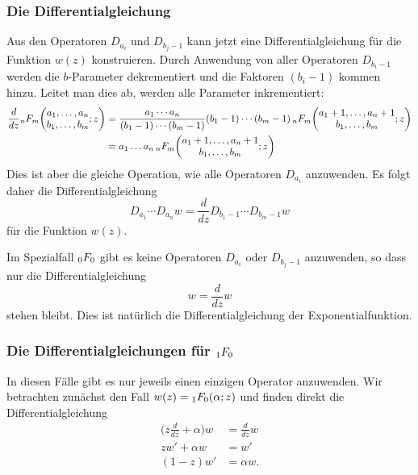 \subsubsection{Die Differentialgleichung}
Aus den Operatoren $D_{a_i}$ und $D_{b_j-1}$ kann jetzt eine
Differentialgleichung für die Funktion $w(z)$ konstruieren.
Durch Anwendung von aller Operatoren $D_{b_i-1}$ werden die
$b$-Parameter dekrementiert und die Faktoren $(b_i-1)$ kommen hinzu.
Leitet man dies ab, werden alle Parameter inkrementiert:
\begin{align*}
\frac{d}{dz}
\mathstrut_nF_m\biggl(
\begin{matrix}a_1,\dots,a_n\\
b_1,\dots,b_m\end{matrix};z
\biggr)
&=
\frac{a_1\cdots a_n}{(b_1-1)\cdots(b_m-1)}
(b_1-1)\cdots(b_m-1)
\,\mathstrut_nF_m\biggl(
\begin{matrix}a_1+1,\dots,a_n+1\\
b_1,\dots,b_m\end{matrix};z
\biggr)
\\
&=
a_1\dots a_n
\,\mathstrut_nF_m\biggl(
\begin{matrix}a_1+1,\dots,a_n+1\\
b_1,\dots,b_m\end{matrix};z
\biggr)
\end{align*}
Dies ist aber die gleiche Operation, wie alle Operatoren $D_{a_i}$ 
anzuwenden.
Es folgt daher die Differentialgleichung 
\[
D_{a_1}\cdots D_{a_n} w = \frac{d}{dz} D_{b_1-1}\cdots D_{b_m-1} w
\]
für die Funktion $w(z)$.

\begin{beispiel}
Im Spezialfall $\mathstrut_0F_0$ gibt es keine Operatoren $D_{a_i}$
oder $D_{b_j-1}$ anzuwenden, so dass nur die Differentialgleichung
\[
w=\frac{d}{dz}w
\]
stehen bleibt.
Dies ist natürlich die Differentialgleichung der Exponentialfunktion.
\end{beispiel}

%
%
\subsubsection{Die Differentialgleichungen für $\mathstrut_1F_0$}
In diesen Fälle gibt es nur jeweils einen einzigen Operator
anzuwenden.
Wir betrachten zunächst den Fall $w(z) = \mathstrut_1F_0(\alpha; z)$
und finden direkt die Differentialgleichung
\begin{align*}
\biggl(z\frac{d}{dz}+\alpha\biggr)w
&=
\frac{d}{dz}w
\\
zw'+\alpha w
&=
w'
\\
(1-z)w'
&=
\alpha w.
\end{align*}


